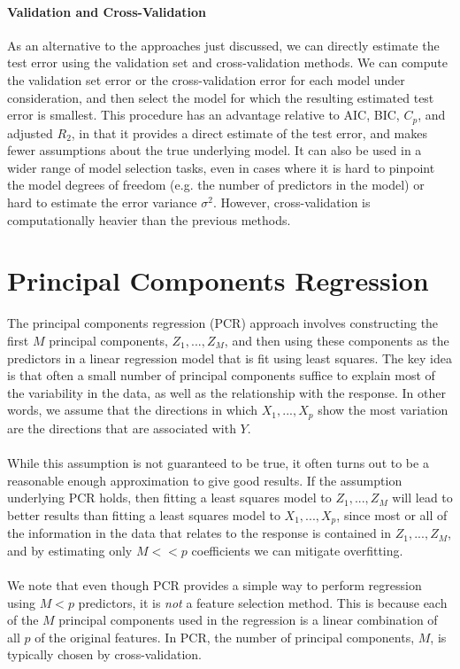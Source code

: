 \paragraph{Validation and Cross-Validation} 
As an alternative to the approaches just discussed, we can directly estimate the test error using the validation set and cross-validation methods. We can compute the validation set error or the cross-validation error for each model under consideration, and then select the model for which the resulting estimated test error is smallest. This procedure has an advantage relative to AIC, BIC, $C_p$, and adjusted $R_2$, in that it provides a direct estimate of the test error, and makes fewer assumptions about the true underlying model. It can also be used in a wider range of model selection tasks, even in cases where it is hard to pinpoint the model degrees of freedom (e.g. the number of predictors in the model) or hard to estimate the error variance $\sigma^2$. However, cross-validation is computationally heavier than the previous methods.

\section{Principal Components Regression}
The principal components regression (PCR) approach involves constructing the first $M$ principal components, $Z_1,...,Z_M$, and then using these components as the predictors in a linear regression model that is fit using least squares. The key idea is that often a small number of principal components suffice to explain most of the variability in the data, as well as the relationship with the response. In other words, we assume that the directions in which $X_1,...,X_p$ show the most variation are the directions that are associated with $Y$.\\\\
While this assumption is not guaranteed to be true, it often turns out to be a reasonable enough approximation to give good results. If the assumption underlying PCR holds, then fitting a least squares model to $Z_1,...,Z_M$ will lead to better results than fitting a least squares model to $X_1,...,X_p$, since most or all of the information in the data that relates to the response is contained in $Z_1,...,Z_M$, and by estimating only $M << p$ coefficients we can mitigate overfitting.\\\\
We note that even though PCR provides a simple way to perform regression using $M<p$ predictors, it is \textit{not} a feature selection method. This is because each of the $M$ principal components used in the regression is a linear combination of all $p$ of the original features. In PCR, the number of principal components, $M$, is typically chosen by cross-validation.
